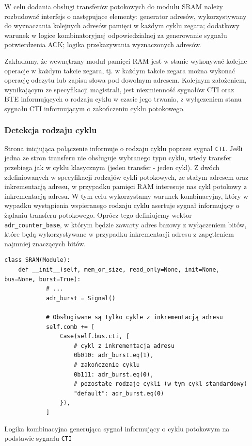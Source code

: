 W celu dodania obsługi transferów potokowych do modułu SRAM należy rozbudować interfejs o następujące elementy: generator adresów, wykorzystywany do wyznaczania kolejnych adresów pamięci w każdym cyklu zegara; dodatkowy warunek w logice kombinatoryjnej odpowiedzialnej za generowanie sygnału potwierdzenia ACK; logika przekazywania wyznaczonych adresów.

Zakładamy, że wewnętrzny moduł pamięci RAM jest w stanie wykonywać kolejne operacje w każdym takcie zegara, tj. w każdym takcie zegara można wykonać operację odczytu lub zapisu słowa pod dowolnym adresem.
Kolejnym założeniem, wynikającym ze specyfikacji magistrali, jest niezmienność sygnałów CTI oraz BTE informujących o rodzaju cyklu w czasie jego trwania, z wyłączeniem stanu sygnału CTI informującym o zakończeniu cyklu potokowego.

\subsubsection{Detekcja rodzaju cyklu}

Strona inicjująca połączenie informuje o rodzaju cyklu poprzez sygnał \texttt{CTI}. Jeśli jedna ze stron transferu nie obsługuje wybranego typu cyklu, wtedy transfer przebiega jak w cyklu klasycznym (jeden transfer - jeden cykl).
Z dwóch zdefiniowanych w specyfikacji rodzajów cykli potokowych, ze stałym adresem oraz inkrementacją adresu, w przypadku pamięci RAM interesuje nas cykl potokowy z inkrementacją adresu. W tym celu wykorzystamy warunek kombinacyjny, który w wypadku wystąpienia wspieranego rodzaju cyklu asertuje sygnał informujący o żądaniu transferu potokowego.
Oprócz tego definiujemy wektor \texttt{adr_counter_base}, w którym będzie zawarty adres bazowy z wyłączeniem bitów, które będą wykorzystywane w przypadku inkrementacji adresu z zapętleniem najmniej znaczących bitów.

\begin{listing}[H]
\begin{verbatim}
class SRAM(Module):
    def __init__(self, mem_or_size, read_only=None, init=None, bus=None, burst=True):
            # ...
            adr_burst = Signal()

            # Obsługiwane są tylko cykle z inkrementacją adresu
            self.comb += [
                Case(self.bus.cti, {
                    # cykl z inkrementacją adresu
                    0b010: adr_burst.eq(1),
                    # zakończenie cyklu
                    0b111: adr_burst.eq(0),
                    # pozostałe rodzaje cykli (w tym cykl standardowy)
                    "default": adr_burst.eq(0)
                }),
            ]
\end{verbatim}
\caption{Logika kombinacyjna generująca sygnał informujący o cyklu potokowym na podstawie sygnału \texttt{CTI}}
\label{lst:impl-sram-detect}
\end{listing}


